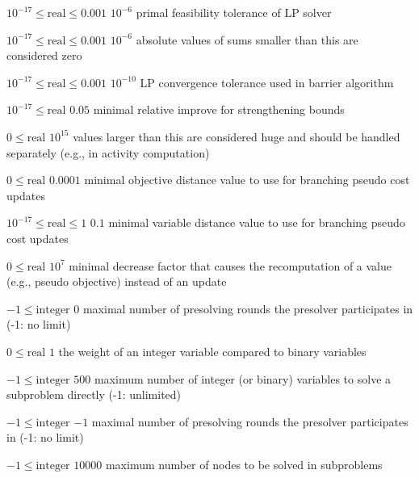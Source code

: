 %
{$10^{-17}\leq\textrm{real}\leq0.001$}%
{$10^{- 6}$}%
{primal feasibility tolerance of LP solver}%
{}

%
{$10^{-17}\leq\textrm{real}\leq0.001$}%
{$10^{- 6}$}%
{absolute values of sums smaller than this are considered zero}%
{}

%
{$10^{-17}\leq\textrm{real}\leq0.001$}%
{$10^{-10}$}%
{LP convergence tolerance used in barrier algorithm}%
{}

%
{$10^{-17}\leq\textrm{real}$}%
{$0.05$}%
{minimal relative improve for strengthening bounds}%
{}

%
{$0\leq\textrm{real}$}%
{$10^{ 15}$}%
{values larger than this are considered huge and should be handled separately (e.g., in activity computation)}%
{}

%
{$0\leq\textrm{real}$}%
{$0.0001$}%
{minimal objective distance value to use for branching pseudo cost updates}%
{}

%
{$10^{-17}\leq\textrm{real}\leq1$}%
{$0.1$}%
{minimal variable distance value to use for branching pseudo cost updates}%
{}

%
{$0\leq\textrm{real}$}%
{$10^{  7}$}%
{minimal decrease factor that causes the recomputation of a value (e.g., pseudo objective) instead of an update}%
{}

%
{$-1\leq\textrm{integer}$}%
{$0$}%
{maximal number of presolving rounds the presolver participates in (-1: no limit)}%
{}

%
{$0\leq\textrm{real}$}%
{$1$}%
{the weight of an integer variable compared to binary variables}%
{}

%
{$-1\leq\textrm{integer}$}%
{$500$}%
{maximum number of integer (or binary) variables to solve a subproblem directly (-1: unlimited)}%
{}

%
{$-1\leq\textrm{integer}$}%
{$-1$}%
{maximal number of presolving rounds the presolver participates in (-1: no limit)}%
{}

%
{$-1\leq\textrm{integer}$}%
{$10000$}%
{maximum number of nodes to be solved in subproblems}%
{}

